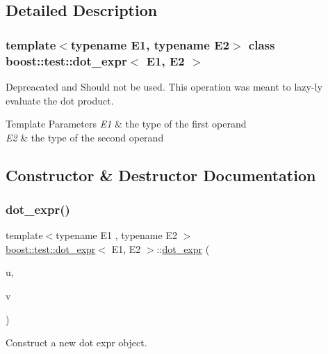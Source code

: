 \subsection{Detailed Description}
\subsubsection*{template$<$typename E1, typename E2$>$\newline
class boost\+::test\+::dot\+\_\+expr$<$ E1, E2 $>$}

Depreacated and Should not be used. This operation was meant to lazy-\/ly evaluate the dot product. 


\begin{DoxyTemplParams}{Template Parameters}
{\em E1} & the type of the first operand \\
\hline
{\em E2} & the type of the second operand \\
\hline
\end{DoxyTemplParams}


\subsection{Constructor \& Destructor Documentation}
\mbox{\label{classboost_1_1test_1_1dot__expr_a7116d6c7f6859d4edcddf9eddf4af6d3}} 
\subsubsection{\texorpdfstring{dot\_expr()}{dot\_expr()}}
{\footnotesize\ttfamily template$<$typename E1 , typename E2 $>$ \\
\mbox{\hyperlink{classboost_1_1test_1_1dot__expr}{boost\+::test\+::dot\+\_\+expr}}$<$ E1, E2 $>$\+::\mbox{\hyperlink{classboost_1_1test_1_1dot__expr}{dot\+\_\+expr}} (\begin{DoxyParamCaption}\item[{E1 const \&}]{u,  }\item[{E2 const \&}]{v }\end{DoxyParamCaption})\hspace{0.3cm}{\ttfamily [inline]}}



Construct a new dot expr object. 


